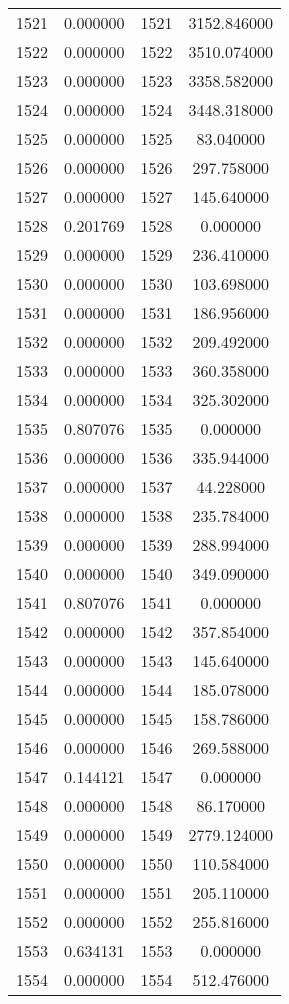 \documentclass[12pt]{article}
\begin{document}
\begin{longtable}{@{}cccc@{}}
1521 & 0.000000 & 1521 & 3152.846000 \\
1522 & 0.000000 & 1522 & 3510.074000 \\
1523 & 0.000000 & 1523 & 3358.582000 \\
1524 & 0.000000 & 1524 & 3448.318000 \\
1525 & 0.000000 & 1525 & 83.040000 \\
1526 & 0.000000 & 1526 & 297.758000 \\
1527 & 0.000000 & 1527 & 145.640000 \\
1528 & 0.201769 & 1528 & 0.000000 \\
1529 & 0.000000 & 1529 & 236.410000 \\
1530 & 0.000000 & 1530 & 103.698000 \\
1531 & 0.000000 & 1531 & 186.956000 \\
1532 & 0.000000 & 1532 & 209.492000 \\
1533 & 0.000000 & 1533 & 360.358000 \\
1534 & 0.000000 & 1534 & 325.302000 \\
1535 & 0.807076 & 1535 & 0.000000 \\
1536 & 0.000000 & 1536 & 335.944000 \\
1537 & 0.000000 & 1537 & 44.228000 \\
1538 & 0.000000 & 1538 & 235.784000 \\
1539 & 0.000000 & 1539 & 288.994000 \\
1540 & 0.000000 & 1540 & 349.090000 \\
1541 & 0.807076 & 1541 & 0.000000 \\
1542 & 0.000000 & 1542 & 357.854000 \\
1543 & 0.000000 & 1543 & 145.640000 \\
1544 & 0.000000 & 1544 & 185.078000 \\
1545 & 0.000000 & 1545 & 158.786000 \\
1546 & 0.000000 & 1546 & 269.588000 \\
1547 & 0.144121 & 1547 & 0.000000 \\
1548 & 0.000000 & 1548 & 86.170000 \\
1549 & 0.000000 & 1549 & 2779.124000 \\
1550 & 0.000000 & 1550 & 110.584000 \\
1551 & 0.000000 & 1551 & 205.110000 \\
1552 & 0.000000 & 1552 & 255.816000 \\
1553 & 0.634131 & 1553 & 0.000000 \\
1554 & 0.000000 & 1554 & 512.476000 \\

\end{longtable}
\end{document}
